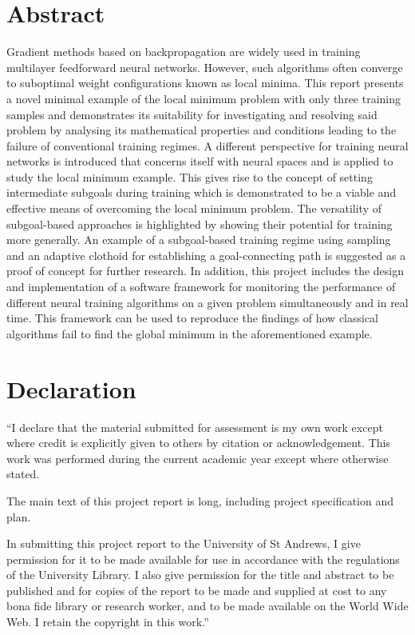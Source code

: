 \chapter*{Abstract}
Gradient methods based on backpropagation are widely used in training multilayer feedforward neural networks. 
However, such algorithms often converge to suboptimal weight configurations known as local minima. 
This report presents a novel minimal example of the local minimum problem with only three training samples and demonstrates its suitability for investigating and resolving said problem by analysing its mathematical properties and conditions leading to the failure of conventional training regimes. 
A different perspective for training neural networks is introduced that concerns itself with neural spaces and is applied to study the local minimum example.
This gives rise to the concept of setting intermediate subgoals during training which is demonstrated to be a viable and effective means of overcoming the local minimum problem. 
The versatility of subgoal-based approaches is highlighted by showing their potential for training more generally. 
An example of a subgoal-based training regime using sampling and an adaptive clothoid for establishing a goal-connecting path is suggested as a proof of concept for further research. 
In addition, this project includes the design and implementation of a software framework for monitoring the performance of different neural training algorithms on a given problem simultaneously and in real time. 
This framework can be used to reproduce the findings of how classical algorithms fail to find the global minimum in the aforementioned example.


\chapter*{Declaration}
``I declare that the material submitted for assessment is my own work except where credit is explicitly given to others by citation or acknowledgement.
This work was performed during the current academic year except where otherwise stated.

The main text of this project report is  long, including project specification and plan.

In submitting this project report to the University of St Andrews, I give permission for it to be made available for use in accordance with the regulations of the University Library. 
I also give permission for the title and abstract to be published and for copies of the report to be made and supplied at cost to any bona fide library or research worker, and to be made available on the World Wide Web.
I retain the copyright in this work.''

